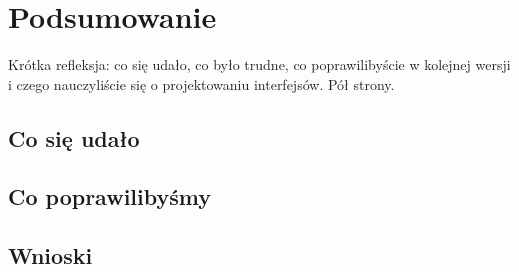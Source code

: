 \section{Podsumowanie}\label{sec:podsumowanie}

\begin{instrukcja}[zalecane]
Krótka refleksja: co się udało, co było trudne, co poprawilibyście w kolejnej wersji i czego
nauczyliście się o projektowaniu interfejsów. Pół strony.
\end{instrukcja}

\subsection{Co się udało}

\subsection{Co poprawilibyśmy}

\subsection{Wnioski}
